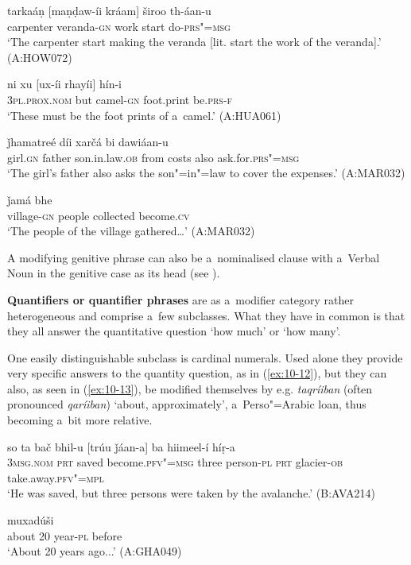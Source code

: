 \begin{exe}
\ex
\label{ex:10-8}
\gll tarkaáṇ [maṇḍaw-íi kráam] široo th-áan-u  \\
carpenter veranda-\textsc{gn} work start do-\textsc{prs"=msg} \\
\glt `The carpenter start making the veranda [lit. start the work of the veranda].' (A:HOW072)

\ex
\label{ex:10-9}
\gll ni xu [ux-íi rhayíi] hín-i \\
\textsc{3pl.prox.nom} but camel-\textsc{gn} foot.print be.\textsc{prs-f}  \\
\glt `These must be the foot prints of a~camel.' (A:HUA061)

\ex
\label{ex:10-10}
 ǰhamatreé díi xarčá bi dawiáan-u \\
girl.\textsc{gn} father son.in.law.\textsc{ob} from costs also ask.for.\textsc{prs"=msg} \\
\glt `The girl's father also asks the son"=in"=law to cover the expenses.' (A:MAR032)

\ex
\label{ex:10-11}
 ǰamá bhe \\
village-\textsc{gn} people collected become.\textsc{cv} \\
\glt `The people of the village gathered{\ldots}' (A:MAR032)
\end{exe}

A modifying genitive phrase can also be a~nominalised clause with a~Verbal Noun in the genitive case as its head (see ).


\textbf{Quantifiers or quantifier phrases} are as a~modifier category rather heterogeneous and comprise a~few subclasses. What they have in common is that they all answer the quantitative question `how much' or `how many'. 


One easily distinguishable subclass is cardinal numerals. Used alone they provide very specific answers to the quantity question, as in (\ref{ex:10-12}), but they can also, as seen in (\ref{ex:10-13}), be modified themselves by e.g. \textit{taqríiban} (often pronounced \textit{qaríiban}) `about, approximately', a~Perso"=Arabic loan, thus becoming a~bit more relative.

\begin{exe}
\ex
\label{ex:10-12}
\gll so ta bač bhil-u [trúu ǰáan-a] ba hiimeel-í híṛ-a  \\
\textsc{3msg.nom} \textsc{prt} saved become.\textsc{pfv"=msg} three  person-\textsc{pl} \textsc{prt} glacier-\textsc{ob} take.away.\textsc{pfv"=mpl} \\
\glt `He was saved, but three persons were taken by the avalanche.' (B:AVA214)

\ex
\label{ex:10-13}
 muxadúši  \\
about 20 year-\textsc{pl} before \\
\glt `About 20 years ago...' (A:GHA049)
\end{exe}

